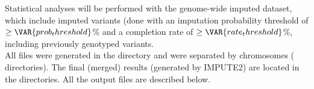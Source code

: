 
Statistical analyses will be performed with the genome-wide imputed dataset,
which include  imputed variants (done with an imputation
probability threshold of $\geq\VAR{ prob_threshold }$\% and a completion rate
of $\geq\VAR{ rate_threshold }$\%, including  previously
genotyped variants.\\

All files were generated in the \texttt{} directory and were
separated by chromosomes (\texttt{} directories). The
final (merged) results (generated by IMPUTE2) are located in the
\texttt{} directories. All the output files are
described below.


